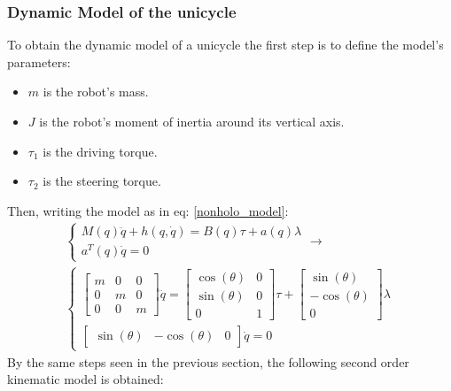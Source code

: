 \subsubsection{Dynamic Model of the unicycle}
To obtain the dynamic model of a unicycle the first step is to define the model's parameters:
\begin{itemize}
    \item $m$ is the robot's mass.
    \item $J$ is the robot's moment of inertia around its vertical axis.
    \item $\tau_1$ is the driving torque.
    \item $\tau_2$ is the steering torque.
\end{itemize}
Then, writing the model as in eq: \ref{nonholo_model}:
\begin{gather*}
    \begin{cases}
        M(q)\ddot{q}+h(q,\dot{q})=B(q)\tau+a(q)\lambda \\
        a^{T}(q)\dot{q}=0
    \end{cases}
    \rightarrow \\
    \begin{cases}
        \begin{bmatrix}
            m & 0 & 0 \\
            0 & m & 0 \\
            0 & 0 & m
        \end{bmatrix}
        \ddot{q} =
        \begin{bmatrix}
            \cos(\theta) & 0 \\
            \sin(\theta) & 0 \\
            0 & 1                                            
        \end{bmatrix}
        \tau + 
        \begin{bmatrix}
            \sin(\theta) \\
            -\cos(\theta)\\
            0
        \end{bmatrix} \lambda\\
        \begin{bmatrix}
            \sin(\theta) & -\cos(\theta) & 0
        \end{bmatrix}
        \dot{q}=0
    \end{cases}
\end{gather*}
By the same steps seen in the previous section, the following second order kinematic model is obtained:
